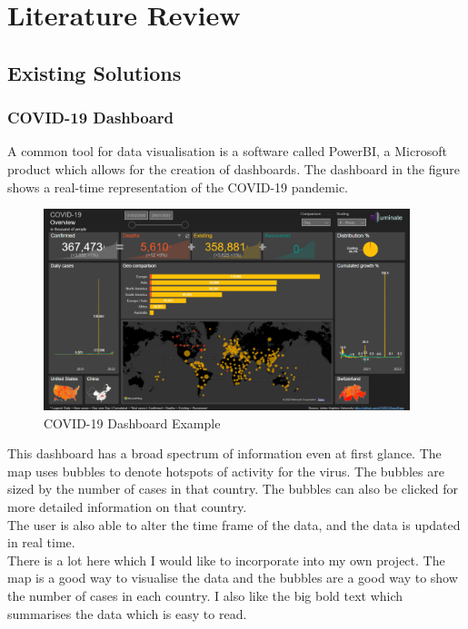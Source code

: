 \documentclass{report}
\begin{document}
\newpage
\chapter{Literature Review}
\section{Existing Solutions}
\subsection{COVID-19 Dashboard}
A common tool for data visualisation is a software called PowerBI, a Microsoft product which allows for the creation of dashboards. 
The dashboard in the figure shows a real-time representation of the COVID-19 pandemic.
\begin{center}
    \begin{figure}[h]
        \centering
        \includegraphics[width=0.95\textwidth]{PowerBI Example.png}
        \caption{COVID-19 Dashboard Example \cite{Badr2023}}
        \label{fig:covid19_dashboard}
    \end{figure}
\end{center}
This dashboard has a broad spectrum of information even at first glance. The map uses bubbles to denote hotspots of activity for the virus. The bubbles are sized by the number of cases in that country. The bubbles can also be clicked for more detailed information on that country. \\
The user is also able to alter the time frame of the data, and the data is updated in real time.\\
There is a lot here which I would like to incorporate into my own project. The map is a good way to visualise the data and the bubbles are a good way to show the number of cases in each country. I also like the big bold text which summarises the data which is easy to read.\\
\newpage
\end{document}
